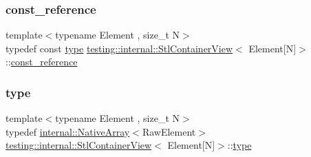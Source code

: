 \subsubsection{\texorpdfstring{const\_reference}{const\_reference}\hspace{0.1cm}{\footnotesize\ttfamily [3/3]}}
{\footnotesize\ttfamily template$<$typename Element , size\+\_\+t N$>$ \\
typedef const \mbox{\hyperlink{classtesting_1_1internal_1_1_stl_container_view_3_01_element[_n]_4_a364efca99cc5a02829b4e3413c506b09}{type}} \mbox{\hyperlink{classtesting_1_1internal_1_1_stl_container_view}{testing\+::internal\+::\+Stl\+Container\+View}}$<$ Element\mbox{[}N\mbox{]}$>$\+::\mbox{\hyperlink{classtesting_1_1internal_1_1_stl_container_view_3_01_element[_n]_4_a481e6ab99316939484fad9c561af5e28}{const\+\_\+reference}}}

\mbox{\label{classtesting_1_1internal_1_1_stl_container_view_3_01_element[_n]_4_a364efca99cc5a02829b4e3413c506b09}} 
\subsubsection{\texorpdfstring{type}{type}\hspace{0.1cm}{\footnotesize\ttfamily [1/3]}}
{\footnotesize\ttfamily template$<$typename Element , size\+\_\+t N$>$ \\
typedef \mbox{\hyperlink{classtesting_1_1internal_1_1_native_array}{internal\+::\+Native\+Array}}$<$Raw\+Element$>$ \mbox{\hyperlink{classtesting_1_1internal_1_1_stl_container_view}{testing\+::internal\+::\+Stl\+Container\+View}}$<$ Element\mbox{[}N\mbox{]}$>$\+::\mbox{\hyperlink{classtesting_1_1internal_1_1_stl_container_view_3_01_element[_n]_4_a364efca99cc5a02829b4e3413c506b09}{type}}}

\mbox{\label{classtesting_1_1internal_1_1_stl_container_view_3_01_element[_n]_4_a364efca99cc5a02829b4e3413c506b09}} 
